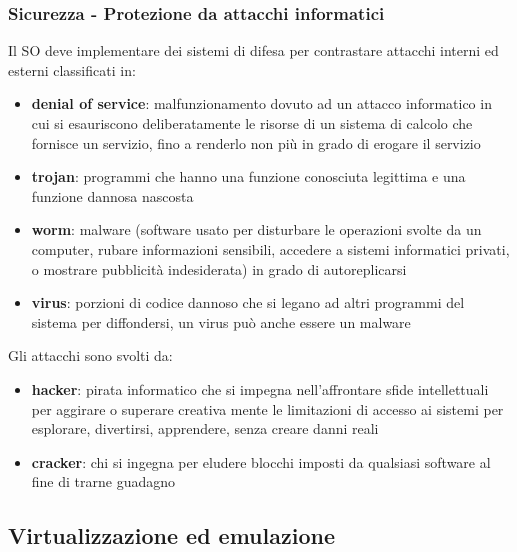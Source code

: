\documentclass[a4paper]{article}
\begin{document}
\subsubsection*{Sicurezza - Protezione da attacchi informatici}
Il SO deve implementare dei sistemi di difesa per contrastare attacchi interni ed esterni classificati in:
\begin{itemize}
	\item \textbf{denial of service}: malfunzionamento dovuto ad un attacco informatico in cui si esauriscono deliberatamente
	le risorse di un sistema di calcolo che fornisce un servizio, fino a renderlo non più in grado di erogare il servizio
	\item \textbf{trojan}: programmi che hanno una funzione conosciuta legittima e una funzione dannosa nascosta
	\item \textbf{worm}: malware (software usato per disturbare le operazioni svolte da un computer, rubare informazioni
	sensibili, accedere a sistemi informatici privati, o mostrare pubblicità indesiderata) in grado di autoreplicarsi
	\item \textbf{virus}: porzioni di codice dannoso che si legano ad altri programmi del sistema per diffondersi, un virus
	può anche essere un malware
\end{itemize}
Gli attacchi sono svolti da:
\begin{itemize}
	\item \textbf{hacker}: pirata informatico che si impegna nell’affrontare sfide intellettuali per aggirare o superare
	creativa mente le limitazioni di accesso ai sistemi per esplorare, divertirsi, apprendere, senza creare danni reali
	\item \textbf{cracker}: chi si ingegna per eludere blocchi imposti da qualsiasi software al fine di trarne guadagno
\end{itemize}



\subsection{Virtualizzazione ed emulazione}
\end{document}
